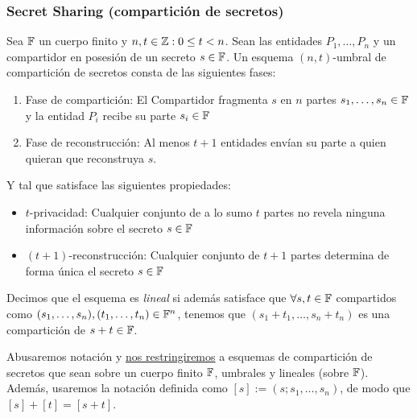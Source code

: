   \subsubsection{Secret Sharing (compartición de secretos)}
  \begin{definition}
    Sea $\mathbb{F}$ un cuerpo finito y $n,t\in \mathbb{Z} : 0\leq t < n$.
    Sean las entidades $P_1,\dots,P_n$ y un compartidor en posesión de un 
    secreto $s\in\mathbb{F}$.
    Un esquema $(n,t)$-umbral de compartición de secretos consta de las siguientes fases:
    \begin{enumerate}
      \item Fase de compartición: El Compartidor fragmenta $s$ en $n$ partes $s_1,\dots,s_n\in\mathbb{F}$
        y la entidad $P_i$ recibe su parte $s_i\in\mathbb{F}$ 
      \item Fase de reconstrucción: Al menos $t+1$ entidades envían su parte a quien quieran 
        que reconstruya $s$.
    \end{enumerate}

    Y tal que satisface las siguientes propiedades:
    \begin{itemize}
      \item $t$-privacidad: Cualquier conjunto de a lo sumo $t$ partes no revela ninguna 
        información sobre el secreto $s\in\mathbb{F}$
      \item $(t+1)$-reconstrucción: Cualquier conjunto de $t+1$ partes determina de forma 
        única el secreto $s\in\mathbb{F}$
    \end{itemize}
  \end{definition}
  \begin{definition}
    Decimos que el esquema es \textit{lineal} si además satisface que $\forall s,t\in\mathbb{F}$
    compartidos como $(s_1,\dots,s_n),(t_1,\dots,t_n)\in\mathbb{F}^n$, tenemos que 
    $(s_1+t_1,\dots,s_n+t_n)$ es una compartición de $s+t\in\mathbb{F}$.
  \end{definition}
  \begin{remark}
    Abusaremos notación y \underline{nos restringiremos} a esquemas de compartición de secretos 
    que sean sobre un cuerpo finito $\mathbb{F}$, umbrales y lineales (sobre $\mathbb{F}$).
    Además, usaremos la notación definida como $[s] := (s; s_1,\dots,s_n)$, de modo que 
    $[s] + [t] = [s+t]$.
  \end{remark}


